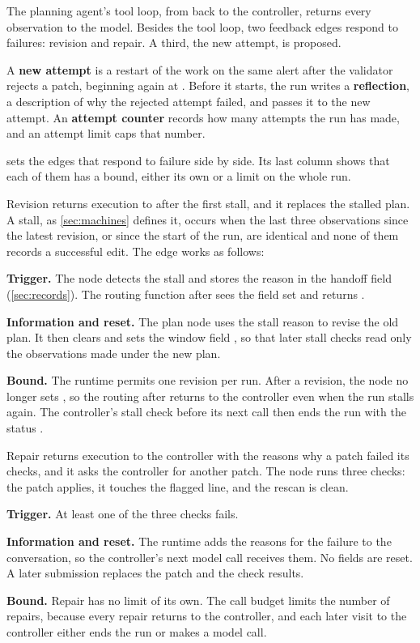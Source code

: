 The planning agent's tool loop, from  back to the controller, returns every
observation to the model. Besides the tool loop, two feedback edges respond to failures: revision and
repair. A third, the new attempt, is proposed.

A \textbf{new attempt} is a restart of the work on the same alert after the validator rejects a
patch, beginning again at . Before it starts, the run writes a \textbf{reflection}, a
description of why the rejected attempt failed, and passes it to the new attempt. An
\textbf{attempt counter} records how many attempts the run has made, and an attempt limit caps that
number.

 sets the edges that respond to failure side by side. Its last column
shows that each of them has a bound, either its own or a limit on the whole run.

Revision returns execution to  after the first stall, and it replaces the stalled
plan. A stall, as \cref{sec:machines} defines it, occurs when the last three observations since the
latest revision, or since the start of the run, are identical and none of them records a successful
edit. The edge works as follows:
\bi
\item \textbf{Trigger.} The  node detects the stall and stores the reason in the
handoff field  (\cref{sec:records}). The routing function after
 sees the field set and returns .
\item \textbf{Information and reset.} The plan node uses the stall reason to revise the old plan. It
then clears  and sets the window field , so that later
stall checks read only the observations made under the new plan.
\item \textbf{Bound.} The runtime permits one revision per run. After a revision, the
 node no longer sets , so the routing after 
returns to the controller even when the run stalls again. The controller's stall check before its
next call then ends the run with the status .
\ei

Repair returns execution to the controller with the reasons why a patch failed its checks, and it
asks the controller for another patch. The  node runs three checks: the patch
applies, it touches the flagged line, and the rescan is clean.
\bi
\item \textbf{Trigger.} At least one of the three checks fails.
\item \textbf{Information and reset.} The runtime adds the reasons for the failure to the
conversation, so the controller's next model call receives them. No fields are reset. A later
submission replaces the patch and the check results.
\item \textbf{Bound.} Repair has no limit of its own. The call budget limits the number of repairs,
because every repair returns to the controller, and each later visit to the controller either ends
the run or makes a model call.
\ei

